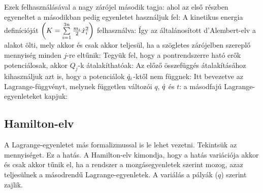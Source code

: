    Ezek felhasználásával a nagy zárójel második tagja:
   ahol az első részben  egyeneltet a másodikban pedig  egyenletet használjuk fel:
   A kinetikus energia definícióját $\left(K=\sum\limits_{i=1}^{3n}\frac{m_i}{2}\dot{x}_i^2\right)$ felhasználva:
   Így az általánosított d'Alembert-elv a
   alakot ölti, mely akkor és csak akkor teljesül, ha a szögletes zárójelben szereplő mennyiség minden $j$-re eltűnik:
   Tegyük fel, hogy a pontrendszerre ható erők potenciálosak, akkor $Q_j$-k átalakíthatóak:
   Az előző összefüggés átalakításához kihasználjuk azt is, hogy a potenciálok $\dot{q}_i$-ktől nem függnek:
   Itt bevezetve az Lagrange-függvényt, melynek független változói $q$, $\dot{q}$ és $t$:
   a másodfajú Lagrange-egyenleteket kapjuk:
   
  \subsection{Hamilton-elv}\label{ss1:hamiltonelv}
   
   A Lagrange-egyenletet más formalizmussal is le lehet vezetni. Tekintsük az 
   mennyiséget. Ez a hatás. A Hamilton-elv kimondja, hogy a hatás variációja akkor és csak akkor tűnik el, ha a rendszer a mozgásegyenletek szerint mozog, azaz teljesülnek a másodrendű Lagrange-egyenletek. A variálás a pályák ($q$) szerint zajlik.
   
